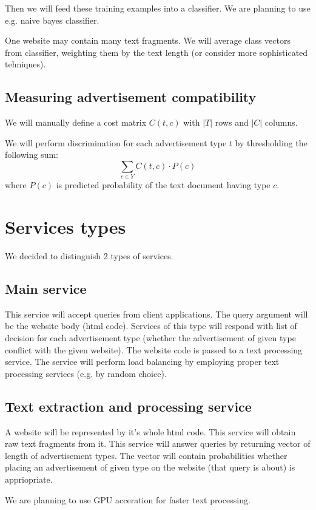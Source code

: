 \documentclass[a4paper]{article}
\begin{document}
Then we will feed these training examples into a classifier.
We are planning to use e.g. naive bayes classifier.

One website may contain many text fragments.
We will average class vectors from classifier,
weighting them by the text length
(or consider more sophisticated tehniques).


\subsection{Measuring advertisement compatibility}

We will manually define a cost matrix $C(t, c)$ 
with $|T|$ rows and $|C|$ columns.

We will perform discrimination for each advertisement type $t$
by thresholding the following sum:
\begin{equation}
    \sum_{c\in{Y}} {C(t, c) \cdot P(c)}
\end{equation}
where $P(c)$ is predicted probability of the text document having type $c$.



\section{Services types}
We decided to distinguish 2 types of services.

\subsection{Main service}
This service will accept queries from client applications.
The query argument will be the website body (html code).
Services of this type will respond with list of decision for each advertisement type
(whether the advertisement of given type conflict with the given website).
The website code is passed to a text processing service.
The service will perform load balancing by employing proper text processing services
(e.g. by random choice).


\subsection{Text extraction and processing service}
A website will be represented by it's whole html code.
This service will obtain raw text fragments from it.
This service will answer queries by returning vector of length of advertisement types.
The vector will contain probabilities whether placing an advertisement of given type
on the website (that query is about) is appriopriate.

We are planning to use GPU acceration for faster text processing.
\end{document}
